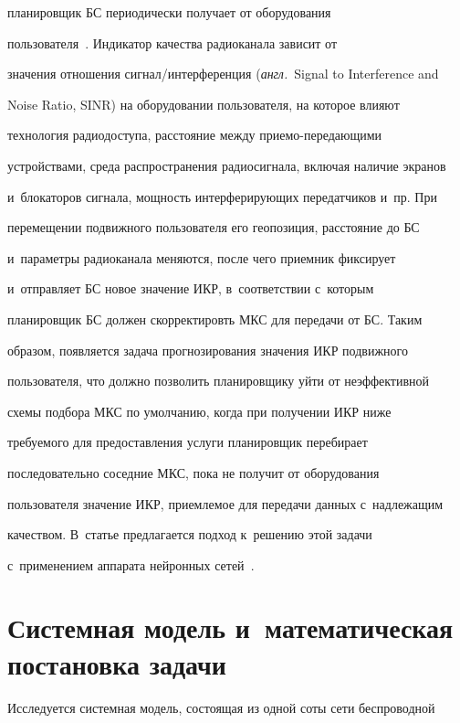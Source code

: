 планировщик БС периодически получает от оборудования 


пользователя~\cite{1-bob}. Индикатор качества радиоканала зависит от 


значения отношения сиг\-нал\!/\!ин\-тер\-фе\-рен\-ция (\textit{англ.}\ Signal to Interference and 


Noise Ratio, SINR) на оборудовании пользователя, на которое влияют 


технология радиодоступа, расстояние между при\-емо-пе\-ре\-да\-ющи\-ми 


устройствами, среда распространения радиосигнала, включая наличие экранов 


и~блокаторов сигнала, мощность интерферирующих передатчиков и~пр. При 


перемещении подвижного пользователя его геопозиция, расстояние до БС 


и~параметры радиоканала меняются, после чего приемник фиксирует 


и~отправляет БС новое значение ИКР, в~соответствии с~которым 


планировщик БС должен скорректировть МКС для передачи от БС. Таким 


образом, появляется задача прогнозирования значения ИКР подвижного 


пользователя, что должно позволить планировщику уйти от неэффективной 


схемы подбора МКС по умолчанию, когда при получении ИКР ниже 


тре\-бу\-емо\-го для предостав\-ле\-ния услуги планировщик перебирает 


последовательно соседние МКС, пока не получит от оборудования 


пользователя значение ИКР, приемлемое для передачи данных с~надлежащим 


качеством. В~статье предлагается подход к~решению этой задачи 


с~применением аппарата нейронных сетей~\cite{2-bob}. 


  


  \section{Системная модель и~математическая постановка задачи}


  


  Исследуется системная модель, состоящая из одной соты сети беспроводной 


